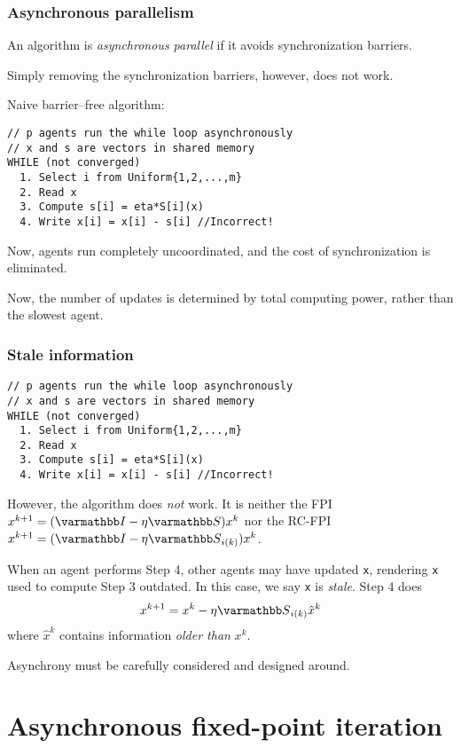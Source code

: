 \documentclass[10pt,mathserif]{beamer}
\begin{document}
\begin{frame}[fragile]
\frametitle{Asynchronous parallelism}
An algorithm is \emph{asynchronous parallel} if it avoids synchronization barriers. 

\medskip

Simply removing the synchronization barriers, however, does not work.
\bigskip

Naive barrier--free algorithm:
\begin{lstlisting}
// p agents run the while loop asynchronously
// x and s are vectors in shared memory
WHILE (not converged)
  1. Select i from Uniform{1,2,...,m}
  2. Read x
  3. Compute s[i] = eta*S[i](x)
  4. Write x[i] = x[i] - s[i] //Incorrect!
\end{lstlisting}
Now, agents run completely uncoordinated, and the cost of synchronization is eliminated.
\medskip

Now, the number of updates is determined by total computing power, rather than the slowest agent.
\end{frame}



\begin{frame}[fragile]
\frametitle{Stale information}

\begin{lstlisting}
// p agents run the while loop asynchronously
// x and s are vectors in shared memory
WHILE (not converged)
  1. Select i from Uniform{1,2,...,m}
  2. Read x
  3. Compute s[i] = eta*S[i](x)
  4. Write x[i] = x[i] - s[i] //Incorrect!
\end{lstlisting}
However, the algorithm does \emph{not} work. It is neither the FPI $x^{k+1}=(\opI-\eta \opS)x^k$ nor the RC-FPI $x^{k+1}=(\opI-\eta \opS_{i(k)})x^k$.
\medskip

When an agent performs Step 4, other agents may have updated \verb|x|, rendering \verb|x| used to compute Step 3 outdated. In this case, we say \verb|x| is \emph{stale}. Step 4 does
\[
x^{k+1}=x^k-\eta \opS_{i(k)}\hat{x}^k
\]
where $\hat{x}^k$ contains information \emph{older than} $x^k$.
\medskip

Asynchrony must be carefully considered and designed around.
\end{frame}

\section{Asynchronous fixed-point iteration}
\end{document}
